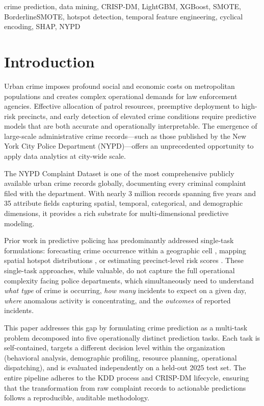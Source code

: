 \documentclass[conference]{IEEEtran}
\begin{document}
\begin{IEEEkeywords}
crime prediction, data mining, CRISP-DM, LightGBM, XGBoost, SMOTE, BorderlineSMOTE, hotspot detection, temporal feature engineering, cyclical encoding, SHAP, NYPD
\end{IEEEkeywords}

\section{Introduction}

Urban crime imposes profound social and economic costs on metropolitan populations and creates complex operational demands for law enforcement agencies. Effective allocation of patrol resources, preemptive deployment to high-risk precincts, and early detection of elevated crime conditions require predictive models that are both accurate and operationally interpretable. The emergence of large-scale administrative crime records—such as those published by the New York City Police Department (NYPD)—offers an unprecedented opportunity to apply data analytics at city-wide scale.

The NYPD Complaint Dataset \cite{nypd2024} is one of the most comprehensive publicly available urban crime records globally, documenting every criminal complaint filed with the department. With nearly 3 million records spanning five years and 35 attribute fields capturing spatial, temporal, categorical, and demographic dimensions, it provides a rich substrate for multi-dimensional predictive modeling.

Prior work in predictive policing has predominantly addressed single-task formulations: forecasting crime occurrence within a geographic cell \cite{mohler2011}, mapping spatial hotspot distributions \cite{chainey2008}, or estimating precinct-level risk scores \cite{perry2013}. These single-task approaches, while valuable, do not capture the full operational complexity facing police departments, which simultaneously need to understand \textit{what type} of crime is occurring, \textit{how many} incidents to expect on a given day, \textit{where} anomalous activity is concentrating, and the \textit{outcomes} of reported incidents.

This paper addresses this gap by formulating crime prediction as a multi-task problem decomposed into five operationally distinct prediction tasks. Each task is self-contained, targets a different decision level within the organization (behavioral analysis, demographic profiling, resource planning, operational dispatching), and is evaluated independently on a held-out 2025 test set. The entire pipeline adheres to the KDD process \cite{fayyad1996} and CRISP-DM \cite{chapman2000} lifecycle, ensuring that the transformation from raw complaint records to actionable predictions follows a reproducible, auditable methodology.
\end{document}
